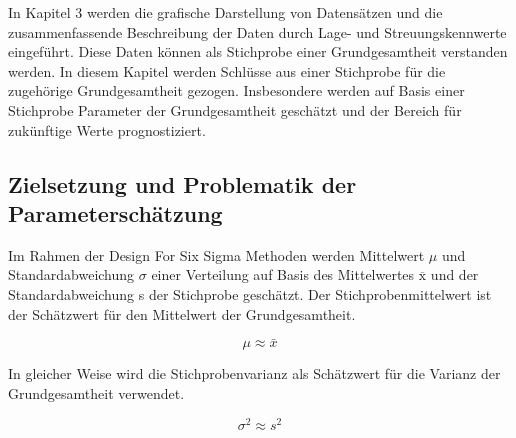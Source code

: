 \noindent In Kapitel 3 werden die grafische Darstellung von Datens\"{a}tzen und die zusammenfassende Beschreibung der Daten durch Lage- und Streuungskennwerte eingef\"{u}hrt. Diese Daten k\"{o}nnen als Stichprobe einer Grundgesamtheit verstanden werden. In diesem Kapitel werden Schl\"{u}sse aus einer Stichprobe f\"{u}r die zugeh\"{o}rige Grundgesamtheit gezogen. Insbesondere werden auf Basis einer Stichprobe Parameter der Grundgesamtheit gesch\"{a}tzt und der Bereich f\"{u}r zuk\"{u}nftige Werte prognostiziert.


\subsection{Zielsetzung und Problematik der Parametersch\"{a}tzung}

\noindent Im Rahmen der Design For Six Sigma Methoden werden Mittelwert $\mu$ und Standardabweichung $\sigma$ einer Verteilung auf Basis des Mittelwertes $\overline{\mathrm{x}}$ und der Standardabweichung s der Stichprobe gesch\"{a}tzt. Der Stichprobenmittelwert ist der Sch\"{a}tzwert f\"{u}r den Mittelwert der Grundgesamtheit. 

\begin{equation}\label{eq:fiveone}
\mu \approx \bar{x}
\end{equation}

\noindent In gleicher Weise wird die Stichprobenvarianz als Sch\"{a}tzwert f\"{u}r die Varianz der Grundgesamtheit verwendet.

\begin{equation}\label{eq:fivetwo}
\sigma ^{2} \approx s^{2}
\end{equation}

